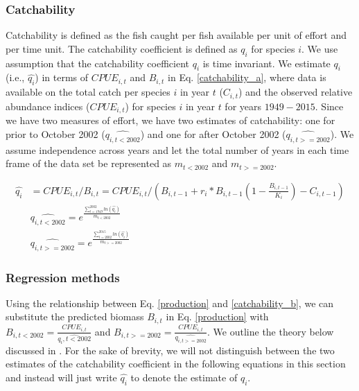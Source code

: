\documentclass[oneside,12pt,final]{sty/ucthesis-CA2012}
\begin{document}
\begin{mainmatter}
\subsubsection{Catchability}
Catchability is defined as the fish caught per fish available per unit of effort and per time unit. The catchability coefficient is defined as $q_{i}$ for species $i$.  We use \citet{hilborn1992quantitative} assumption that the catchability coefficient $q_{i}$ is time invariant. We estimate $q_{i}$ (i.e., $\widehat{q_{i}} $) in terms of $CPUE_{i,t}$ and $B_{i,t}$ in Eq. \ref{catchability_a}, where data is available on the total catch per species $i$ in year $t$ ($C_{i,t}$) and the observed relative abundance indices ($CPUE_{i,t}$) for species $i$ in year $t$ for years $1949-2015$. Since we have two measures of effort, we have two estimates of catchability: one for prior to October 2002 ($\widehat{q_{i,t<2002}}$) and one for after October 2002 ($\widehat{q_{i,t>=2002}}$). We assume independence across years and let the total number of years in each time frame of the data set be represented as $m_{t<2002}$ and $m_{t>=2002}$. 

\begin{align} \label{catchability_a}
\widehat{q_i} &= CPUE_{i,t}/B_{i,t}  = CPUE_{i,t}/\left(B_{i,t-1} + r_i*B_{i,t-1} \left( 1- \frac{B_{i,t-1}}{K_i} \right)-C_{i,t-1} \right) \\ \label{catchability_b}
&\widehat{q_{i,t<2002}} = e^{\frac{\sum_{t=1949}^{2002} ln(\widehat{q_{i}})}{m_{t<2002}}}  \\
&\widehat{q_{i,t>=2002}} = e^{\frac{\sum_{t=2002}^{2015} ln(\widehat{q_{i}})}{m_{t>=2002}}}  
\end{align}

\subsubsection{Regression methods}
Using the relationship between Eq. \ref{production} and \ref{catchability_b}, we can substitute the predicted biomass $B_{i,t}$ in Eq. \ref{production} with $B_{i,t<2002}=\frac{CPUE_{i,t}}{\widehat{q_{i},t<2002}} $ and $B_{i,t>=2002}=\frac{CPUE_{i,t}}{\widehat{q_{i,t>=2002}}} $. We outline the theory below discussed in \citet{hilborn1992quantitative}. For the sake of brevity, we will not distinguish between the two estimates of the catchability coefficient in the following equations in this section and instead will just write $\widehat{q_i}$ to denote the estimate of $q_i$.


\end{mainmatter}
\end{document}
